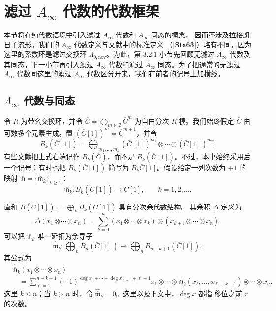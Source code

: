 
\section{滤过 $A_\infty$ 代数的代数框架}
\label{sec:3-2}

本节将在纯代数语境中引入滤过 $A_\infty$ 代数和 $A_\infty$ 同态的概念，
因而不涉及拉格朗日子流形。我们的 $A_\infty$ 代数定义与文献中的标准定义
（\textbf{[Sta63]}）略有不同，因为这里的系数环是滤过交换环
$\Lambda_{0,\mathrm{nov}}$。为此，第 3.2.1 小节先回顾无滤过
$A_\infty$ 代数及其同态，下一小节再引入滤过 $A_\infty$ 代数和滤过
$A_\infty$ 同态。为了把通常的无滤过 $A_\infty$ 代数同这里的滤过
$A_\infty$ 代数区分开来，我们在前者的记号上加横线。

\subsection{$A_\infty$ 代数与同态}
\label{subsec:3-2-1}

令 $R$ 为带幺交换环，并令
$\overline C=\bigoplus_{m\in\mathbb Z}\overline C^m$ 为自由分次
$R$-模。我们始终假定 $\overline C$ 由可数多个元素生成。置
$(\overline C[1])^m=\overline C^{m+1}$，并令
\[
  B_k(\overline C[1])
  =\bigoplus_{m_1,\ldots,m_k}
  (\overline C[1])^{m_1}\otimes\cdots\otimes
  (\overline C[1])^{m_k}.
\]
有些文献把上式右端记作 $B_k(\overline C)$，而不是
$B_k(\overline C[1])$。不过，本书始终采用后一个记号；有时也把
$B_k(\overline C[1])$ 简写为 $B_k\overline C[1]$。假设给定一列次数为
$+1$ 的映射 $\overline{\mathfrak m}
=\{\overline{\mathfrak m}_k\}_{k\geq1}$：
\[
  \overline{\mathfrak m}_k\colon B_k(\overline C[1])
  \longrightarrow\overline C[1],
  \qquad k=1,2,\ldots.
\]

直和
$B(\overline C[1]):=\bigoplus_k B_k(\overline C[1])$ 具有分次余代数结构。
其余积 $\Delta$ 定义为
\[
  \Delta(x_1\otimes\cdots\otimes x_n)
  =\sum_{k=0}^{n}
  (x_1\otimes\cdots\otimes x_k)
  \otimes(x_{k+1}\otimes\cdots\otimes x_n).
\]
可以把 $\overline{\mathfrak m}_k$ 唯一延拓为余导子
\[
  \widehat{\overline{\mathfrak m}}_k\colon
  \bigoplus_n B_n(\overline C[1])
  \longrightarrow
  \bigoplus_n B_{n-k+1}(\overline C[1]),
\]
其公式为
\begin{equation}
\begin{aligned}
  &\widehat{\overline{\mathfrak m}}_k
  (x_1\otimes\cdots\otimes x_n)\\
  &\quad={}
  \sum_{\ell=1}^{n-k+1}
  (-1)^{\deg x_1+\cdots+\deg x_{\ell-1}+\ell-1}
  x_1\otimes\cdots\otimes
  \overline{\mathfrak m}_k
  (x_\ell,\ldots,x_{\ell+k-1})
  \otimes\cdots\otimes x_n .
\end{aligned}
\tag{3.2.1}\label{eq:3-2-1}
\end{equation}
这里 $k\leq n$；当 $k>n$ 时，令
$\widehat{\overline{\mathfrak m}}_k=0$。这里以及下文中，$\deg x$ 都指
移位之前 $x$ 的次数。

